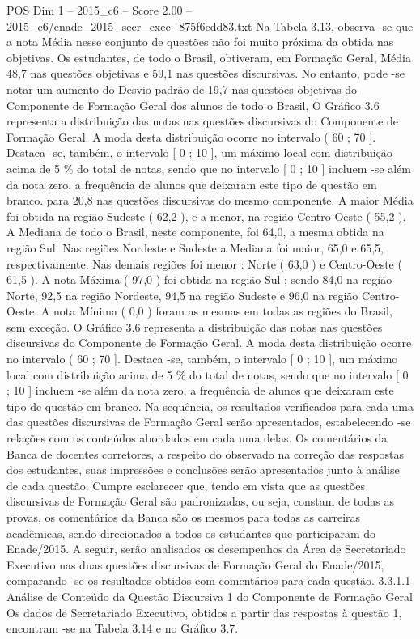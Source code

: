 \begin{textsample}{POS Dim 1 – 2015\_c6 – Score 2.00 – 2015\_c6/enade\_2015\_secr\_exec\_875f6cdd83.txt}
Na Tabela 3.13, observa -se que a nota Média nesse conjunto de questões não foi muito próxima da obtida nas objetivas.
Os estudantes, de todo o Brasil, obtiveram, em Formação Geral, Média 48,7 nas questões objetivas e 59,1 nas questões discursivas.
No entanto, pode -se notar um aumento do Desvio padrão de 19,7 nas questões objetivas do Componente de Formação Geral dos alunos de todo o Brasil, O Gráfico 3.6 representa a distribuição das notas nas questões discursivas do Componente de Formação Geral.
A moda desta distribuição ocorre no intervalo ( 60 ; 70 ].
Destaca -se, também, o intervalo [ 0 ; 10 ], um máximo local com distribuição acima de 5 \% do total de notas, sendo que no intervalo [ 0 ; 10 ] incluem -se além da nota zero, a frequência de alunos que deixaram este tipo de questão em branco. para 20,8 nas questões discursivas do mesmo componente.
A maior Média foi obtida na região Sudeste ( 62,2 ), e a menor, na região Centro-Oeste ( 55,2 ).
A Mediana de todo o Brasil, neste componente, foi 64,0, a mesma obtida na região Sul.
Nas regiões Nordeste e Sudeste a Mediana foi maior, 65,0 e 65,5, respectivamente.
Nas demais regiões foi menor : Norte ( 63,0 ) e Centro-Oeste ( 61,5 ).
A nota Máxima ( 97,0 ) foi obtida na região Sul ; sendo 84,0 na região Norte, 92,5 na região Nordeste, 94,5 na região Sudeste e 96,0 na região Centro-Oeste.
A nota Mínima ( 0,0 ) foram as mesmas em todas as regiões do Brasil, sem exceção.
O Gráfico 3.6 representa a distribuição das notas nas questões discursivas do Componente de Formação Geral.
A moda desta distribuição ocorre no intervalo ( 60 ; 70 ].
Destaca -se, também, o intervalo [ 0 ; 10 ], um máximo local com distribuição acima de 5 \% do total de notas, sendo que no intervalo [ 0 ; 10 ] incluem -se além da nota zero, a frequência de alunos que deixaram este tipo de questão em branco.
Na sequência, os resultados verificados para cada uma das questões discursivas de Formação Geral serão apresentados, estabelecendo -se relações com os conteúdos abordados em cada uma delas.
Os comentários da Banca de docentes corretores, a respeito do observado na correção das respostas dos estudantes, suas impressões e conclusões serão apresentados junto à análise de cada questão.
Cumpre esclarecer que, tendo em vista que as questões discursivas de Formação Geral são padronizadas, ou seja, constam de todas as provas, os comentários da Banca são os mesmos para todas as carreiras acadêmicas, sendo direcionados a todos os estudantes que participaram do Enade/2015.
A seguir, serão analisados os desempenhos da Área de Secretariado Executivo nas duas questões discursivas de Formação Geral do Enade/2015, comparando -se os resultados obtidos com comentários para cada questão. 3.3.1.1 Análise de Conteúdo da Questão Discursiva 1 do Componente de Formação Geral Os dados de Secretariado Executivo, obtidos a partir das respostas à questão 1, encontram -se na Tabela 3.14 e no Gráfico 3.7.

\end{textsample}
